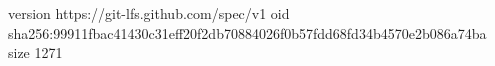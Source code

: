 version https://git-lfs.github.com/spec/v1
oid sha256:99911fbac41430c31eff20f2db70884026f0b57fdd68fd34b4570e2b086a74ba
size 1271
